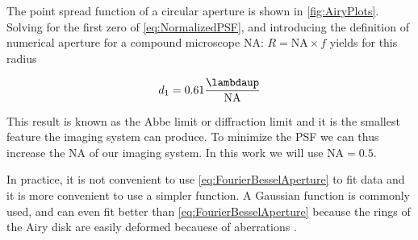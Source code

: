 The point spread function of a circular aperture is shown in \cref{fig:AiryPlots}. 
Solving for the first zero of \cref{eq:NormalizedPSF}, and introducing the definition of numerical aperture for a compound microscope \ac{NA}: $R = \text{NA} \times f$ yields for this radius 

\begin{equation}\label{eq:Abbe}
    d_1 = 0.61 \frac{\lambdaup}{\text{NA}}
\end{equation}

This result is known as the Abbe limit or diffraction limit \cite{Hecht2002} and it is the smallest feature the imaging system can produce. 
To minimize the \ac{PSF} we can thus increase the \ac{NA} of our imaging system. In this work we will use $\text{NA} = 0.5$. 

In practice, it is not convenient to use \cref{eq:FourierBesselAperture} to fit data and it is more convenient to use a simpler function. 
A Gaussian function is commonly used, and can even fit better than \cref{eq:FourierBesselAperture} because the rings of the Airy disk are easily deformed becauese of aberrations \cite{Knottnerus2018}. 

